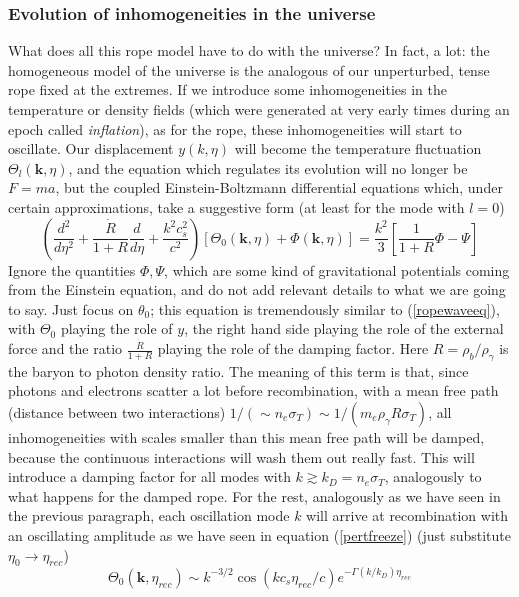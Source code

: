 \subsubsection{Evolution of inhomogeneities in the universe}
What does all this rope model have to do with the universe? In fact, a lot: the homogeneous model of the universe is the analogous of our unperturbed, tense rope fixed at the extremes. If we introduce some inhomogeneities in the temperature or density fields (which were generated at very early times during an epoch called \textit{inflation}), as for the rope, these inhomogeneities will start to oscillate. Our displacement $y(k,\eta)$ will become the temperature fluctuation $\Theta_l(\mathbf{k},\eta)$, and the equation which regulates its evolution will no longer be $F=ma$, but the coupled Einstein-Boltzmann differential equations which, under certain approximations, take a suggestive form (at least for the mode with $l=0$)
\begin{equation}
\label{monopolepert}
\left(\frac{d^2}{d\eta^2}+\frac{\dot{R}}{1+R}\frac{d}{d\eta}+\frac{k^2c_s^2}{c^2}\right)[\Theta_0(\mathbf{k},\eta)+\Phi(\mathbf{k},\eta)]=\frac{k^2}{3}\left[\frac{1}{1+R}\Phi -\Psi\right]
\end{equation}  
Ignore the quantities $\Phi,\Psi$, which are some kind of gravitational potentials coming from the Einstein equation, and do not add relevant details to what we are going to say. Just focus on $\theta_0$; this equation is tremendously similar to (\ref{ropewaveeq}), with $\Theta_0$ playing the role of $y$, the right hand side playing the role of the external force and the ratio $\frac{\dot{R}}{1+R}$ playing the role of the damping factor. Here $R=\rho_b/\rho_\gamma$ is the baryon to photon density ratio. The meaning of this term is that, since photons and electrons scatter a lot before recombination, with a mean free path (distance between two interactions) $1/(\sim n_e \sigma_T)\sim 1/(m_e\rho_\gamma R\sigma_T)$, all inhomogeneities with scales smaller than this mean free path will be damped, because the continuous interactions will wash them out really fast. This will introduce a damping factor for all modes with $k\gtrsim k_D=n_e\sigma_T$, analogously to what happens for the damped rope. For the rest, 
analogously as we have seen in the previous paragraph, each oscillation mode $k$ will arrive at recombination with an oscillating amplitude as we have seen in equation (\ref{pertfreeze}) (just substitute $\eta_0\rightarrow \eta_{rec}$) 
\begin{equation}
\label{solmonop}
\Theta_0(\mathbf{k},\eta_{rec})\sim k^{-3/2} \cos{(kc_s\eta_{rec}/c)}e^{-\Gamma(k/k_D)\eta_{rec}}
\end{equation}
